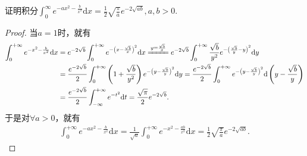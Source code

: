 \documentclass[../../main.tex]{subfiles}%
\begin{document}
\begin{example}\label{example:常用定积分公式}
证明积分$\int_{0}^{\infty}e^{-ax^{2}-\frac{b}{x^{2}}}\mathrm{d}x=\frac{1}{2}\sqrt{\frac{\pi}{a}}e^{-2\sqrt{ab}},a,b>0.$
\end{example}
\begin{proof}
当\(a=1\)时，就有
\begin{align*}
\int_0^{+\infty}{e^{-x^2-\frac{b}{x^2}}\mathrm{d}x}&=e^{-2\sqrt{b}}\int_0^{+\infty}{e^{-\left( x-\frac{\sqrt{b}}{x} \right) ^2}\mathrm{d}x}\xlongequal{y=\frac{\sqrt{b}}{x}}e^{-2\sqrt{b}}\int_0^{+\infty}{\frac{\sqrt{b}}{y^2}e^{-\left( \frac{\sqrt{b}}{y}-y \right) ^2}\mathrm{d}y}\nonumber\\
&=\frac{e^{-2\sqrt{b}}}{2}\int_0^{+\infty}{\left( 1+\frac{\sqrt{b}}{y^2} \right) e^{-\left( y-\frac{\sqrt{b}}{y} \right) ^2}\mathrm{d}y}=\frac{e^{-2\sqrt{b}}}{2}\int_0^{+\infty}{e^{-\left( y-\frac{\sqrt{b}}{y} \right) ^2}\mathrm{d}\left( y-\frac{\sqrt{b}}{y} \right)}\nonumber\\
&=\frac{e^{-2\sqrt{b}}}{2}\int_{-\infty}^{+\infty}{e^{-t^2}\mathrm{d}t}=\frac{\sqrt{\pi}}{2}e^{-2\sqrt{b}}.
\end{align*}
于是对\(\forall a>0\)，就有
\begin{align*}
\int_0^{+\infty}{e^{-ax^2-\frac{b}{x^2}}\mathrm{d}x}=\frac{1}{\sqrt{a}}\int_0^{+\infty}{e^{-x^2-\frac{ab}{x^2}}\mathrm{d}x}=\frac{1}{2}\sqrt{\frac{\pi}{a}}e^{-2\sqrt{ab}}.
\end{align*}
\end{proof}
\end{document}

